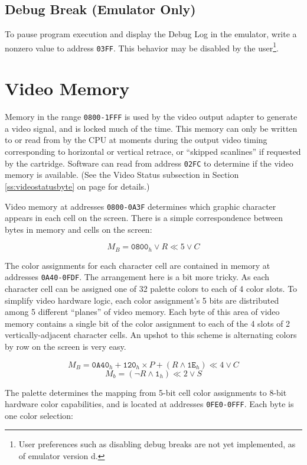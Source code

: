 \documentclass[12pt]{{memoir}}
\begin{document}
\subsection{Debug Break (Emulator Only)}

To pause program execution and display the Debug Log in the emulator, write a nonzero value to address \texttt{03FF}. This behavior may be disabled by the user\footnote{User preferences such as disabling debug breaks are not yet implemented, as of emulator version d.}.

\section{Video Memory}
\label{sec:videomem}

Memory in the range \texttt{0800-1FFF} is used by the video output adapter to generate a video signal, and is locked much of the time. This memory can only be written to or read from by the CPU at moments during the output video timing corresponding to horizontal or vertical retrace, or ``skipped scanlines'' if requested by the cartridge. Software can read from address \texttt{02FC} to determine if the video memory is available. (See the Video Status subsection in Section \ref{ss:videostatusbyte} on page \pageref{ss:videostatusbyte} for details.)

Video memory at addresses \texttt{0800-0A3F} determines which graphic character appears in each cell on the screen. There is a simple correspondence between bytes in memory and cells on the screen:

$$M_B = \texttt{0800}_h \vee  R \ll 5 \vee C$$

The color assignments for each character cell are contained in memory at addresses \texttt{0A40-0FDF}. The arrangement here is a bit more tricky. As each character cell can be assigned one of 32 palette colors to each of 4 color slots. To simplify video hardware logic, each color assignment's 5 bits are distributed among 5 different ``planes'' of video memory. Each byte of this area of video memory contains a single bit of the color assignment to each of the 4 slots of 2 vertically-adjacent character cells. An upshot to this scheme is alternating colors by row on the screen is very easy.

$$M_B = \texttt{0A40}_h + \texttt{120}_h \times P + (R \wedge \texttt{1E}_h) \ll 4 \vee C$$
$$M_b = (\lnot{R} \wedge \texttt{1}_h) \ll 2 \vee S$$

The palette determines the mapping from 5-bit cell color assignments to 8-bit hardware color capabilities, and is located at addresses \texttt{0FE0-0FFF}. Each byte is one color selection:
\end{document}
